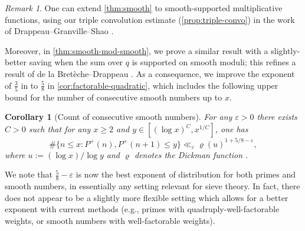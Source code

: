 \documentclass[reqno,11pt]{amsart}
\newtheorem{corollary}[theorem]{Corollary}
\theoremstyle{remark}
\newtheorem*{remark}{Remark}
\numberwithin{equation}{section}
\newcommand{\eps}{\varepsilon}
\begin{document}
\begin{remark}
One can extend \cref{thm:smooth} to smooth-supported multiplicative functions, using our triple convolution estimate (\cref{prop:triple-convo}) in the work of Drappeau--Granville--Shao \cite{drappeau2017smooth}.
\end{remark}

Moreover, in \cref{thm:smooth-mod-smooth}, we prove a similar result with a slightly-better saving when the sum over $q$ is supported on smooth moduli; this refines a result of de la Bret\`eche--Drappeau \cite[(2.1)]{de2020niveau}. As a consequence, we improve the exponent of $\tfrac{3}{5}$ in \cite[Th\'eor\`eme 4.1]{de2020niveau} to $\tfrac{5}{8}$ in \cref{cor:factorable-quadratic}, which includes the following upper bound for the number of consecutive smooth numbers up to $x$.

\begin{corollary}[Count of consecutive smooth numbers] \label{cor:consec-smooth}
    For any $\eps > 0$ there exists $C > 0$ such that for any $x \ge 2$ and $y \in [(\log x)^C, x^{1/C}]$, one has
    \[
        \#\{n \le x : P^+(n), P^+(n+1) \le y\} \ll_\eps \varrho(u)^{1 + 5/8-\eps},
    \]
    where $u := (\log x)/\log y$ and $\varrho$ denotes the Dickman function \cite{hildebrand1986number}.
\end{corollary}

We note that $\tfrac{5}{8} - \eps$ is now the best exponent of distribution for both primes and smooth numbers, in essentially any setting relevant for sieve theory. In fact, there does not appear to be a slightly more flexible setting which allows for a better exponent with current methods (e.g., primes with quadruply-well-factorable weights, or smooth numbers with well-factorable weights).
\end{document}
